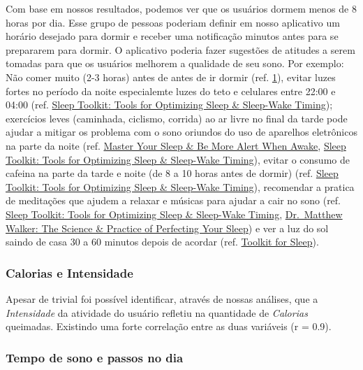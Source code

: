 \documentclass[11pt]{article}
\begin{document}
Com base em nossos resultados, podemos ver que os usuários dormem menos
de 8 horas por dia. Esse grupo de pessoas poderiam definir em nosso
aplicativo um horário desejado para dormir e receber uma notificação
minutos antes para se prepararem para dormir. O aplicativo poderia fazer
sugestões de atitudes a serem tomadas para que os usuários melhorem a
qualidade de seu sono. Por exemplo: Não comer muito (2-3 horas) antes de
antes de ir dormir (ref.
\href{https://health.clevelandclinic.org/is-eating-before-bed-bad-for-you}{1}),
evitar luzes fortes no período da noite especialemte luzes do teto e
celulares entre 22:00 e 04:00 (ref.
\href{https://youtu.be/h2aWYjSA1Jc?t=3733}{Sleep Toolkit: Tools for
    Optimizing Sleep \& Sleep-Wake Timing}); exercícios leves (caminhada,
ciclismo, corrida) ao ar livre no final da tarde pode ajudar a mitigar
os problema com o sono oriundos do uso de aparelhos eletrônicos na parte
da noite (ref. \href{https://youtu.be/nm1TxQj9IsQ?t=2614}{Master Your
    Sleep \& Be More Alert When Awake},
\href{https://youtu.be/h2aWYjSA1Jc?t=3858}{Sleep Toolkit: Tools for
    Optimizing Sleep \& Sleep-Wake Timing}), evitar o consumo de cafeina na
parte da tarde e noite (de 8 a 10 horas antes de dormir) (ref.
\href{https://youtu.be/h2aWYjSA1Jc?t=2272}{Sleep Toolkit: Tools for
    Optimizing Sleep \& Sleep-Wake Timing}), recomendar a pratica de
meditações que ajudem a relaxar e músicas para ajudar a cair no sono
(ref.
\href{https://hubermanlab.com/sleep-toolkit-tools-for-optimizing-sleep-and-sleep-wake-timing/}{Sleep
    Toolkit: Tools for Optimizing Sleep \& Sleep-Wake Timing},
\href{https://youtu.be/gbQFSMayJxk}{Dr.~Matthew Walker: The Science \&
    Practice of Perfecting Your Sleep}) e ver a luz do sol saindo de casa 30
a 60 minutos depois de acordar (ref.
\href{https://hubermanlab.com/toolkit-for-sleep/}{Toolkit for Sleep}).

\hypertarget{calorias-e-intensidade}{%
    \subsubsection{Calorias e Intensidade}\label{calorias-e-intensidade}}

Apesar de trivial foi possível identificar, através de nossas análises,
que a \emph{Intensidade} da atividade do usuário refletiu na quantidade
de \emph{Calorias} queimadas. Existindo uma forte correlação entre as
duas variáveis (r = 0.9).

\hypertarget{tempo-de-sono-e-passos-no-dia}{%
    \subsubsection{Tempo de sono e passos no
        dia}\label{tempo-de-sono-e-passos-no-dia}}
\end{document}
